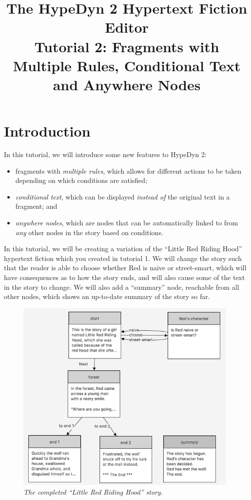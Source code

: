 \documentclass{article}
\begin{document}
\title{The HypeDyn 2 Hypertext Fiction Editor\\Tutorial 2: Fragments with Multiple Rules, Conditional Text and Anywhere Nodes}
\date{}

\onecolumn
\maketitle

\tableofcontents


\section{Introduction}
In this tutorial, we will introduce some new features to HypeDyn 2:

\begin{itemize}
  \item fragments with \textit{multiple rules}, which allows for different actions to be taken depending on which conditions are satisfied;
  \item \textit{conditional text}, which can be displayed \textit{instead of} the original text in a fragment; and 
  \item \textit{anywhere nodes}, which are nodes that can be automatically linked to from \textit{any} other nodes in the story based on conditions.
\end{itemize}

In this tutorial, we will be creating a variation of the ``Little Red Riding Hood'' hypertext fiction which you created in tutorial 1. We will change the story such that the reader is able to choose whether Red is naive or street-smart, which will have consequences as to how the story ends, and will also cause some of the text in the story to change. We will also add a ``summary'' node, reachable from all other nodes, which shows an up-to-date summary of the story so far.

\begin{figure}[h]
  \centering
  \includegraphics[width=11cm]{images/hypedyn-tutorial-2-figure-1}
  \caption{\textit{The completed ``Little Red Riding Hood'' story.}}
  \label{fig:tut2:completed}
\end{figure} 
\end{document}
